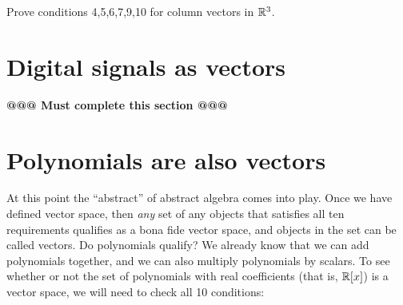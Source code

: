 %
%

\begin{exercise}{}
Prove conditions 4,5,6,7,9,10 for column vectors in $\mathbb{R}^3$.
\end{exercise}

\section{Digital signals as vectors}
\textbf{@@@ Must complete this section @@@}

\section{Polynomials are also  vectors}\label{sec:polyAreVec}

At this point the ``abstract''  of abstract algebra comes into play. Once we have defined vector space, then \emph{any} set of any objects that satisfies all ten requirements qualifies as a bona fide vector space, and objects in the set can be called vectors. Do polynomials qualify? We already know that we can add polynomials together, and we can also multiply polynomials by  scalars. To see whether or not the set of polynomials with real coefficients (that is, $\mathbb{R}[x]$) is a vector space, we will need to check all 10 conditions: 
\medskip{}

